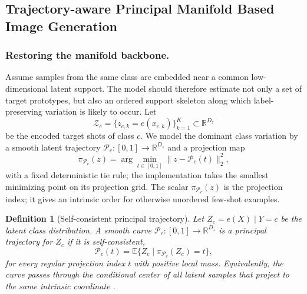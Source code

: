 \documentclass[preprint,12pt,number]{elsarticle}
\newtheorem{definition}{Definition}
\begin{document}
\subsection{Trajectory-aware Principal Manifold Based Image Generation}
\subsubsection{Restoring the manifold backbone.} Assume samples from the same class are embedded near a common low-dimensional latent support. The model should therefore estimate not only a set of target prototypes, but also an ordered support skeleton along which label-preserving variation is likely to occur. Let
\[
	\mathcal{Z}_c=\{z_{c,k}=e(x_{c,k})\}_{k=1}^{K}\subset\mathbb{R}^{D_z}
\]
be the encoded target shots of class $c$. We model the dominant class variation by a smooth latent trajectory $\mathcal{P}_c:[0,1]\rightarrow\mathbb{R}^{D_z}$ and a projection map
\[
	\pi_{\mathcal{P}_c}(z)
	=
	\arg\min_{t\in[0,1]}\lVert z-\mathcal{P}_c(t)\rVert_2^2,
\]
	with a fixed deterministic tie rule; the implementation takes the smallest minimizing point on its projection grid. The scalar $\pi_{\mathcal{P}_c}(z)$ is the projection index; it gives an intrinsic order for otherwise unordered few-shot examples.

\begin{definition}[Self-consistent principal trajectory]
	Let $Z_c=e(X)\mid Y=c$ be the latent class distribution. A smooth curve $\mathcal{P}_c:[0,1]\rightarrow\mathbb{R}^{D_z}$ is a principal trajectory for $Z_c$ if it is self-consistent,
	\[
		\mathcal{P}_c(t)
		=
		\mathbb{E}\{Z_c\mid \pi_{\mathcal{P}_c}(Z_c)=t\},
	\]
	for every regular projection index $t$ with positive local mass. Equivalently, the curve passes through the conditional center of all latent samples that project to the same intrinsic coordinate \citep{hastie1989principal, tibshirani1992}.
\end{definition}
\end{document}
